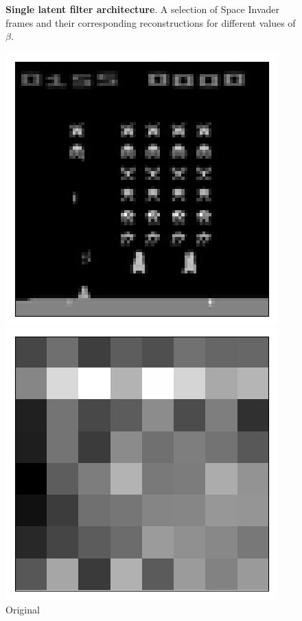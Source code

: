 \begin{figure}[h!]
\begin{multicols}{4}
    \caption{$\beta = 16$}
\end{multicols}
\caption{\textbf{Single latent filter architecture}. A selection of Space Invader frames and their corresponding reconstructions for different values of $\beta$.}
\label{fig:latent_image_originals_and_reconstructions}
\end{figure}


\begin{figure}[h!]
\centering
\captionsetup{justification=centering}
\begin{multicols}{4}
    \includegraphics[scale=0.4]{figures/results/latent_image/beta_1_sample_10_original.png}
    \caption{Original}
    \includegraphics[scale=0.4]{figures/results/latent_image/beta_1_sample_10_latent.png}

\end{multicols}
\end{figure}
